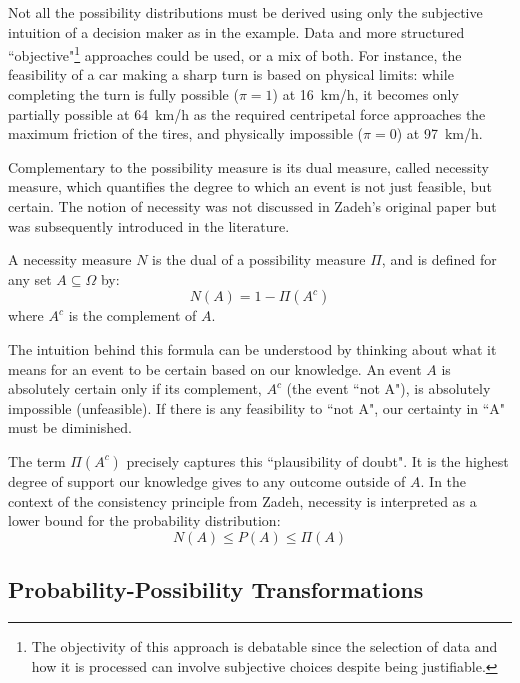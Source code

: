 \begin{remark}
    Not all the possibility distributions must be derived using only the subjective intuition of a decision maker as in the example. Data and more structured ``objective"\footnote{The objectivity of this approach is debatable since the selection of data and how it is processed can involve subjective choices despite being justifiable.} approaches could be used, or a mix of both. 
    For instance, the feasibility of a car making a sharp turn is based on physical limits: while completing the turn is fully possible ($\pi=1$) at 16~km/h, it becomes only partially possible at 64~km/h as the required centripetal force approaches the maximum friction of the tires, and physically impossible ($\pi=0$) at 97~km/h.
\end{remark}

Complementary to the possibility measure is its dual measure, called necessity measure, which quantifies the degree to which an event is not just feasible, but certain. The notion of necessity was not discussed in Zadeh's original paper but was subsequently introduced in the literature.

\begin{definition}
A necessity measure $N$ is the dual of a possibility measure $\Pi$, and is defined for any set $A \subseteq \Omega$ by:
\[ N(A) = 1 - \Pi(A^c) \]
where $A^c$ is the complement of $A$.
\end{definition}

The intuition behind this formula can be understood by thinking about what it means for an event to be certain based on our knowledge. An event $A$ is absolutely certain only if its complement, $A^c$ (the event ``not A"), is absolutely impossible (unfeasible). If there is any feasibility to ``not A", our certainty in ``A" must be diminished.

The term $\Pi(A^c)$ precisely captures this ``plausibility of doubt". It is the highest degree of support our knowledge gives to any outcome outside of $A$. In the context of the consistency principle from Zadeh, necessity is interpreted as a lower bound for the probability distribution:
\[N(A) \le P(A) \le \Pi(A)\]

\subsection{Probability-Possibility Transformations}

